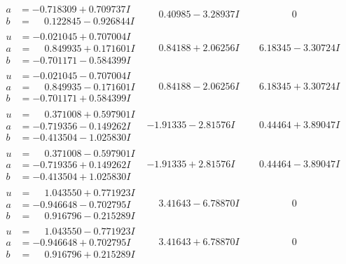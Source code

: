 \documentclass[1p]{elsarticle_modified}
\theoremstyle{definition}
\begin{document}
$$\begin{array}{c|c|c}
\begin{aligned}
a &= -0.718309 + 0.709737 I \\
b &= \phantom{-}0.122845 - 0.926844 I\end{aligned}
 & \phantom{-}0.40985 - 3.28937 I & \phantom{-0.000000 } 0 \\ \hline\begin{aligned}
u &= -0.021045 + 0.707004 I \\
a &= \phantom{-}0.849935 + 0.171601 I \\
b &= -0.701171 - 0.584399 I\end{aligned}
 & \phantom{-}0.84188 + 2.06256 I & \phantom{-}6.18345 - 3.30724 I \\ \hline\begin{aligned}
u &= -0.021045 - 0.707004 I \\
a &= \phantom{-}0.849935 - 0.171601 I \\
b &= -0.701171 + 0.584399 I\end{aligned}
 & \phantom{-}0.84188 - 2.06256 I & \phantom{-}6.18345 + 3.30724 I \\ \hline\begin{aligned}
u &= \phantom{-}0.371008 + 0.597901 I \\
a &= -0.719356 - 0.149262 I \\
b &= -0.413504 - 1.025830 I\end{aligned}
 & -1.91335 - 2.81576 I & \phantom{-}0.44464 + 3.89047 I \\ \hline\begin{aligned}
u &= \phantom{-}0.371008 - 0.597901 I \\
a &= -0.719356 + 0.149262 I \\
b &= -0.413504 + 1.025830 I\end{aligned}
 & -1.91335 + 2.81576 I & \phantom{-}0.44464 - 3.89047 I \\ \hline\begin{aligned}
u &= \phantom{-}1.043550 + 0.771923 I \\
a &= -0.946648 - 0.702795 I \\
b &= \phantom{-}0.916796 - 0.215289 I\end{aligned}
 & \phantom{-}3.41643 - 6.78870 I & \phantom{-0.000000 } 0 \\ \hline\begin{aligned}
u &= \phantom{-}1.043550 - 0.771923 I \\
a &= -0.946648 + 0.702795 I \\
b &= \phantom{-}0.916796 + 0.215289 I\end{aligned}
 & \phantom{-}3.41643 + 6.78870 I & \phantom{-0.000000 } 0 \\ \hline\begin{aligned}

\end{aligned}
\end{array}$$
\end{document}
